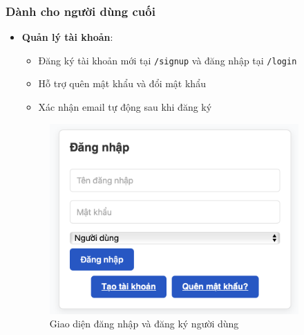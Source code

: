 \documentclass[12pt,a4paper]{article}
\begin{document}
\subsubsection{Dành cho người dùng cuối}
\begin{itemize}[leftmargin=1cm]
    \item \textbf{Quản lý tài khoản}:
        \begin{itemize}[leftmargin=0.5cm]
            \item Đăng ký tài khoản mới tại \texttt{/signup} và đăng nhập tại \texttt{/login}
            \item Hỗ trợ quên mật khẩu và đổi mật khẩu
            \item Xác nhận email tự động sau khi đăng ký
        \end{itemize}
\begin{figure}[H]
    \centering
    \includegraphics[width=0.9\textwidth]{../images/ui_user_dang_nhap_dang_ky.png} %
    \caption{Giao diện đăng nhập và đăng ký người dùng}
    \label{fig:ui_user_login_signup}
\end{figure}


\end{itemize}
\end{document}
